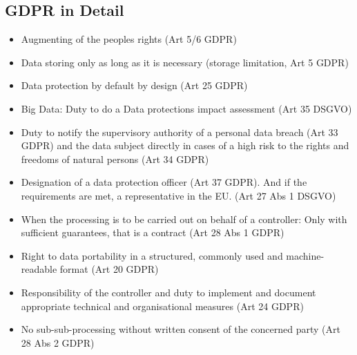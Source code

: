 \documentclass[11pt]{article}
\theoremstyle{definition}
\begin{document}
\subsection{GDPR in Detail}
\begin{itemize}
	\item Augmenting of the peoples rights (Art 5/6 GDPR)
	\item Data storing only as long as it is necessary (storage limitation, Art 5 GDPR)
	\item Data protection by default by design (Art 25 GDPR)
	\item Big Data: Duty to do a Data protections impact assessment (Art 35 DSGVO)
	\item Duty to notify the supervisory authority of a personal data breach (Art 33 GDPR) and the data subject directly in cases of a high risk to the rights and freedoms of natural persons (Art 34 GDPR)
	\item Designation of a data protection officer (Art 37 GDPR). And if the requirements are met, a representative in the EU. (Art 27 Abs 1 DSGVO)
	\item When the processing is to be carried out on behalf of a controller: Only with sufficient guarantees, that is a contract (Art 28 Abs 1 GDPR)
	\item Right to data portability in a structured, commonly used and machine-readable format (Art 20 GDPR)
	\item Responsibility of the controller and duty to implement and document appropriate technical and organisational measures (Art 24 GDPR)
	\item No sub-sub-processing without written consent of the concerned party (Art 28 Abs 2 GDPR)
\end{itemize}
\end{document}
